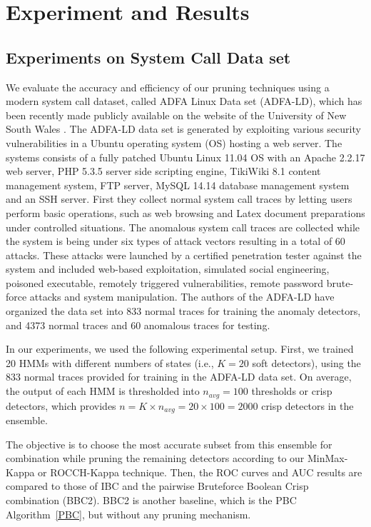 \chapter{Experiment and Results} \label{chapter4}

\section{Experiments on System Call Data set}
\label{sec:experiments}

We evaluate the accuracy and efficiency of our pruning techniques using a modern system call dataset, called ADFA Linux Data set (ADFA-LD), which has been recently made publicly available on the website of the University of New South Wales \cite{Creech2013a}.
The ADFA-LD data set is generated by exploiting various security vulnerabilities in a Ubuntu operating system (OS) hosting a web server.
The systems consists of a fully patched Ubuntu Linux 11.04 OS with an Apache 2.2.17 web server, PHP 5.3.5 server side scripting engine, TikiWiki 8.1 content management system, FTP server, MySQL 14.14 database management system and an SSH server.
First they collect normal system call traces by letting users perform basic operations, such as web browsing and Latex document preparations under controlled situations.
The anomalous system call traces are collected while the system is being under six types of attack vectors resulting in a total of 60 attacks.
These attacks were launched by a certified penetration tester against the system and included web-based exploitation, simulated social engineering, poisoned executable, remotely triggered vulnerabilities, remote password brute-force attacks and system manipulation.
The authors of the ADFA-LD have organized the data set into 833 normal traces for training the anomaly detectors, and 4373 normal traces and 60 anomalous traces for testing.

In our experiments, we used the following experimental setup.
First, we trained 20 HMMs with different numbers of states (i.e., $K=20$ soft detectors), using the 833 normal traces provided for training in the ADFA-LD data set.
On average, the output of each HMM is thresholded into $n_{avg} = 100$ thresholds or crisp detectors, which provides $n = K \times n_{avg} = 20\times 100 =2000$ crisp detectors in the ensemble.

The objective is to choose the most accurate subset from this ensemble for combination while pruning the remaining detectors according to our MinMax-Kappa or ROCCH-Kappa technique.
Then, the ROC curves and AUC results are compared to those of IBC and the pairwise Bruteforce Boolean Crisp combination (BBC2).
BBC2 is another baseline, which is the PBC Algorithm~\ref{PBC}, but without any pruning mechanism.

